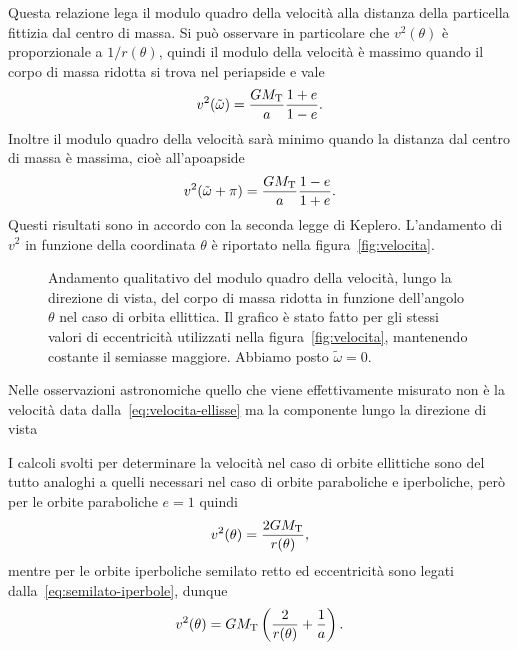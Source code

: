 Questa relazione lega il modulo quadro della velocità alla distanza della
particella fittizia dal centro di massa. Si può osservare in particolare che
$v^2(\theta)$ è proporzionale a $1/r(\theta)$, quindi il modulo della velocità è
massimo quando il corpo di massa ridotta si trova nel periapside e vale
\begin{equation}
  v^2(\tilde\omega) = \frac{GM_\textup{T}}{a}\frac{1+e}{1-e}.
\end{equation}
Inoltre il modulo quadro della velocità sarà minimo quando la distanza dal
centro di massa è massima, cioè all'apoapside
\begin{equation}
  v^2(\tilde\omega+\pi) = \frac{GM_\textup{T}}{a}\frac{1-e}{1+e}.
\end{equation}
Questi risultati sono in accordo con la seconda legge di Keplero. L'andamento di
$v^2$ in funzione della coordinata $\theta$ è riportato nella
figura~\ref{fig:velocita}.

\begin{figure}
  \centering
  
  \caption{Andamento qualitativo del modulo quadro della velocità, lungo la
    direzione di vista, del corpo di massa ridotta in funzione dell'angolo
    $\theta$ nel caso di orbita ellittica. Il grafico è stato fatto per gli
    stessi valori di eccentricità utilizzati nella figura~\ref{fig:velocita},
    mantenendo costante il semiasse maggiore. Abbiamo posto $\tilde\omega=0$.}
  \label{fig:velocita-los}
\end{figure}
Nelle osservazioni astronomiche quello che viene effettivamente misurato non è
la velocità data dalla~\eqref{eq:velocita-ellisse} ma la componente lungo la
direzione di vista %

I calcoli svolti per determinare la velocità nel caso di orbite ellittiche sono
del tutto analoghi a quelli necessari nel caso di orbite paraboliche e
iperboliche, però per le orbite paraboliche $e=1$ quindi
\begin{equation}
  \label{eq:velocita-parabola}
  v^2(\theta) = \frac{2GM_\textup{T}}{r(\theta)},
\end{equation}
mentre per le orbite iperboliche semilato retto ed eccentricità sono legati
dalla~\eqref{eq:semilato-iperbole}, dunque
\begin{equation}
  \label{eq:velocita-iperbole}
  v^2(\theta) = GM_\textup{T}
    \left(
      \frac{2}{r(\theta)} + \frac{1}{a}
    \right).
\end{equation}


